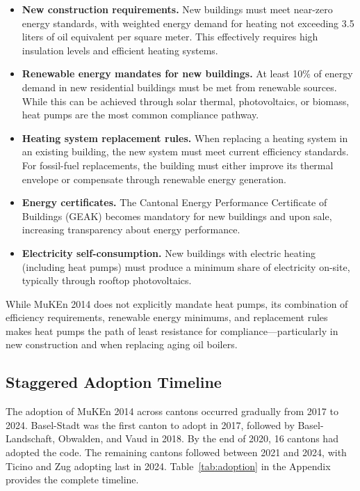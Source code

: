 \documentclass[12pt]{article}
\begin{document}
\begin{itemize}
    \item \textbf{New construction requirements.} New buildings must meet near-zero energy standards, with weighted energy demand for heating not exceeding 3.5 liters of oil equivalent per square meter. This effectively requires high insulation levels and efficient heating systems.

    \item \textbf{Renewable energy mandates for new buildings.} At least 10\% of energy demand in new residential buildings must be met from renewable sources. While this can be achieved through solar thermal, photovoltaics, or biomass, heat pumps are the most common compliance pathway.

    \item \textbf{Heating system replacement rules.} When replacing a heating system in an existing building, the new system must meet current efficiency standards. For fossil-fuel replacements, the building must either improve its thermal envelope or compensate through renewable energy generation.

    \item \textbf{Energy certificates.} The Cantonal Energy Performance Certificate of Buildings (GEAK) becomes mandatory for new buildings and upon sale, increasing transparency about energy performance.

    \item \textbf{Electricity self-consumption.} New buildings with electric heating (including heat pumps) must produce a minimum share of electricity on-site, typically through rooftop photovoltaics.
\end{itemize}

While MuKEn 2014 does not explicitly mandate heat pumps, its combination of efficiency requirements, renewable energy minimums, and replacement rules makes heat pumps the path of least resistance for compliance---particularly in new construction and when replacing aging oil boilers.

\subsection{Staggered Adoption Timeline}

The adoption of MuKEn 2014 across cantons occurred gradually from 2017 to 2024. Basel-Stadt was the first canton to adopt in 2017, followed by Basel-Landschaft, Obwalden, and Vaud in 2018. By the end of 2020, 16 cantons had adopted the code. The remaining cantons followed between 2021 and 2024, with Ticino and Zug adopting last in 2024. Table~\ref{tab:adoption} in the Appendix provides the complete timeline.
\end{document}
